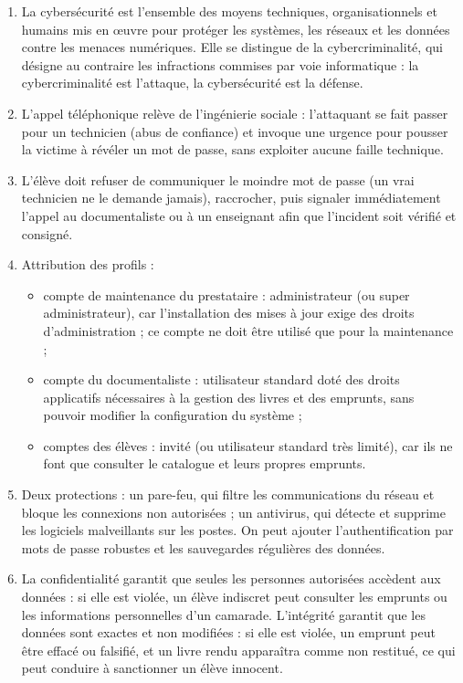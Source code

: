 \documentclass[11pt]{article}
\newcommand{\cle}[1]{{\popxbold\color{popdark}#1}}
\begin{document}
\begin{corrige}
\begin{enumerate}
\item La \cle{cybersécurité} est l'ensemble des moyens techniques, organisationnels et humains mis en œuvre pour protéger les systèmes, les réseaux et les données contre les menaces numériques. Elle se distingue de la \cle{cybercriminalité}, qui désigne au contraire les infractions commises par voie informatique : la cybercriminalité est l'attaque, la cybersécurité est la défense.
\item L'appel téléphonique relève de l'\cle{ingénierie sociale} : l'attaquant se fait passer pour un technicien (abus de confiance) et invoque une urgence pour pousser la victime à révéler un mot de passe, sans exploiter aucune faille technique.
\item L'élève doit refuser de communiquer le moindre mot de passe (un vrai technicien ne le demande jamais), raccrocher, puis signaler immédiatement l'appel au documentaliste ou à un enseignant afin que l'incident soit vérifié et consigné.
\item Attribution des profils :
\begin{itemize}
\item compte de maintenance du prestataire : \cle{administrateur} (ou super administrateur), car l'installation des mises à jour exige des droits d'administration ; ce compte ne doit être utilisé que pour la maintenance ;
\item compte du documentaliste : \cle{utilisateur standard} doté des droits applicatifs nécessaires à la gestion des livres et des emprunts, sans pouvoir modifier la configuration du système ;
\item comptes des élèves : \cle{invité} (ou utilisateur standard très limité), car ils ne font que consulter le catalogue et leurs propres emprunts.
\end{itemize}
\item Deux protections : un \cle{pare-feu}, qui filtre les communications du réseau et bloque les connexions non autorisées ; un \cle{antivirus}, qui détecte et supprime les logiciels malveillants sur les postes. On peut ajouter l'authentification par mots de passe robustes et les sauvegardes régulières des données.
\item La \cle{confidentialité} garantit que seules les personnes autorisées accèdent aux données : si elle est violée, un élève indiscret peut consulter les emprunts ou les informations personnelles d'un camarade. L'\cle{intégrité} garantit que les données sont exactes et non modifiées : si elle est violée, un emprunt peut être effacé ou falsifié, et un livre rendu apparaîtra comme non restitué, ce qui peut conduire à sanctionner un élève innocent.
\end{enumerate}
\end{corrige}
\end{document}
